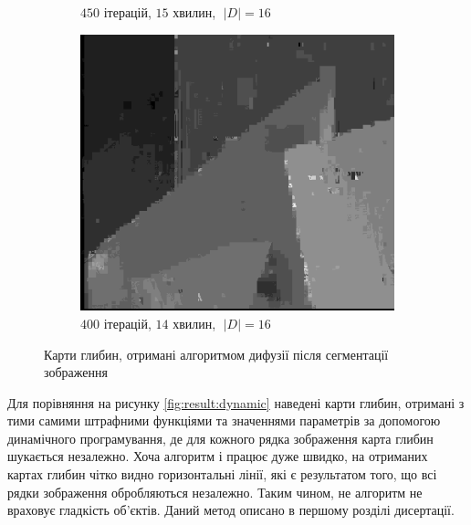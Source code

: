 \begin{figure}[h]
\begin{subfigure}[t]{0.32\textwidth}
        \caption{$450$ ітерацій, $15$ хвилин, $\; \left| D \right| = 16$}
        \label{fig:flowerpots:superpixel}
    \end{subfigure}
    \hfill
    \begin{subfigure}[t]{0.32\textwidth}
        \centering
        \includegraphics[width=\textwidth]{images/poster_superpixel_based_stereo}
        \caption{$400$ ітерацій, $14$ хвилин, $\; \left| D \right| = 16$}
        \label{fig:poster:superpixel}
    \end{subfigure}
    \caption{Карти глибин, отримані алгоритмом дифузії після сегментації зображення}
    \label{fig:result:superpixel}
\end{figure}

Для порівняння на рисунку \ref{fig:result:dynamic}
наведені карти глибин,
отримані з тими самими штрафними функціями
та значеннями параметрів за допомогою динамічного програмування,
де для кожного рядка зображення карта глибин шукається незалежно.
Хоча алгоритм і працює дуже швидко,
на отриманих картах глибин чітко видно горизонтальні лінії,
які є результатом того, що всі рядки зображення обробляються незалежно.
Таким чином, не алгоритм не враховує гладкість об'єктів.
Даний метод описано в першому розділі дисертації.

